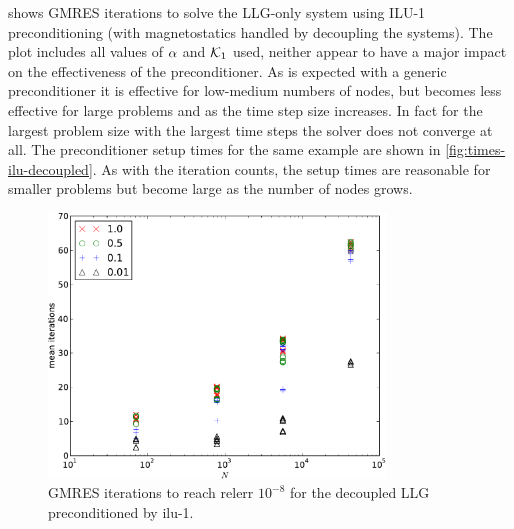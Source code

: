 



 shows GMRES iterations to solve the LLG-only system using ILU-1 preconditioning (with magnetostatics handled by decoupling the systems).
The plot includes all values of $\alpha$ and $\mathcal{K}_1$ used, neither appear to have a major impact on the effectiveness of the preconditioner. 
As is expected with a generic preconditioner it is effective for low-medium numbers of nodes, but becomes less effective for large problems and as the time step size increases.
In fact for the largest problem size with the largest time steps the solver does not converge at all.
The preconditioner setup times for the same example are shown in \cref{fig:times-ilu-decoupled}.
As with the iteration counts, the setup times are reasonable for smaller problems but become large as the number of nodes grows.

\begin{figure}
  \centering
  \includegraphics[width=0.8\textwidth]{plots/linear_solvers/ilu-1decoupleddummy-meanofnsolveritersvsinitialnnode.pdf}
  \caption{GMRES iterations to reach relerr $10^{-8}$ for the decoupled LLG preconditioned by ilu-1.}
  \label{fig:its-ilu-decoupled}
\end{figure}

